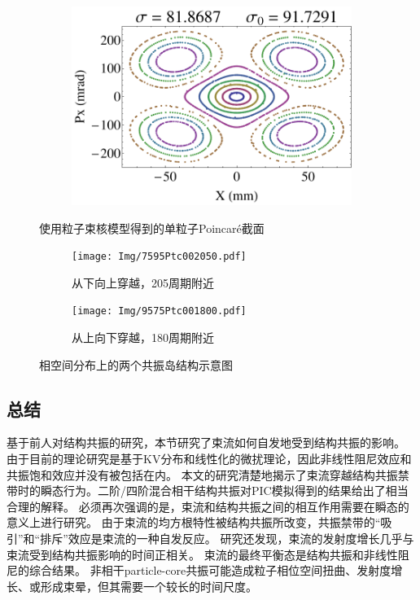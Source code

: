 \begin{figure}
\begin{subfigure}[b]{0.24\textwidth}
        \caption{}\label{sfig:TestPtc3}
    \end{subfigure}
    \begin{subfigure}[b]{0.24\textwidth}
        \includegraphics[width=\textwidth]{Img/TestParticle4.pdf}
        \caption{}\label{sfig:TestPtc4}
    \end{subfigure}
    \caption{使用粒子束核模型得到的单粒子Poincar\'{e}截面}
    \label{fig:TestPtc}
\end{figure}

\begin{figure}[!hbp]
    \centering
    \begin{subfigure}[b]{0.45\textwidth}
        \texttt{[image: Img/7595Ptc002050.pdf]}
        \caption{从下向上穿越，205周期附近}
        \label{sfig:Ptc2tails1}
    \end{subfigure}
    \begin{subfigure}[b]{0.45\textwidth}
        \texttt{[image: Img/9575Ptc001800.pdf]}
        \caption{从上向下穿越，180周期附近}
        \label{sfig:Ptc2tails2}
    \end{subfigure}
    \caption{相空间分布上的两个共振岛结构示意图}
    \label{fig:Ptc2tail}
\end{figure}


\subsection{总结}
\label{section:Crossing_Summary}
基于前人对结构共振的研究，本节研究了束流如何自发地受到结构共振的影响。
由于目前的理论研究是基于KV分布和线性化的微扰理论，因此非线性阻尼效应和共振饱和效应并没有被包括在内。
本文的研究清楚地揭示了束流穿越结构共振禁带时的瞬态行为。二阶/四阶混合相干结构共振对PIC模拟得到的结果给出了相当合理的解释。
必须再次强调的是，束流和结构共振之间的相互作用需要在瞬态的意义上进行研究。
由于束流的均方根特性被结构共振所改变，共振禁带的“吸引”和“排斥”效应是束流的一种自发反应。
研究还发现，束流的发射度增长几乎与束流受到结构共振影响的时间正相关。
束流的最终平衡态是结构共振和非线性阻尼的综合结果。
非相干particle-core共振可能造成粒子相位空间扭曲、发射度增长、或形成束晕，但其需要一个较长的时间尺度。

